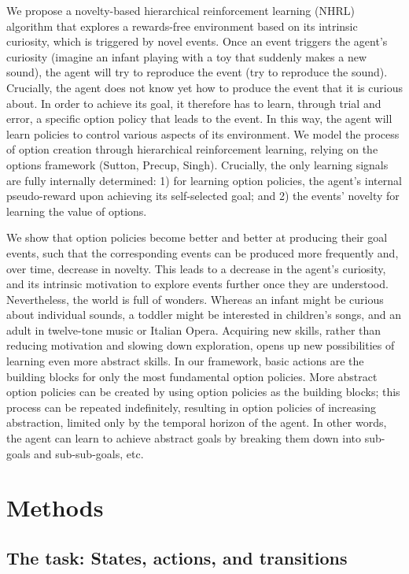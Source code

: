 \documentclass{article}
\begin{document}
We propose a novelty-based hierarchical reinforcement learning (NHRL) algorithm that explores a rewards-free environment based on its intrinsic curiosity, which is triggered by novel events. Once an event triggers the agent's curiosity (imagine an infant playing with a toy that suddenly makes a new sound), the agent will try to reproduce the event (try to reproduce the sound). Crucially, the agent does not know yet how to produce the event that it is curious about. In order to achieve its goal, it therefore has to learn, through trial and error, a specific option policy that leads to the event. In this way, the agent will learn policies to control various aspects of its environment. We model the process of option creation through hierarchical reinforcement learning, relying on the options framework (Sutton, Precup, Singh). Crucially, the only learning signals are fully internally determined: 1) for learning option policies, the agent's internal pseudo-reward upon achieving its self-selected goal; and 2) the events' novelty for learning the value of options.

We show that option policies become better and better at producing their goal events, such that the corresponding events can be produced more frequently and, over time, decrease in novelty. This leads to a decrease in the agent's curiosity, and its intrinsic motivation to explore events further once they are understood. Nevertheless, the world is full of wonders. Whereas an infant might be curious about individual sounds, a toddler might be interested in children's songs, and an adult in twelve-tone music or Italian Opera. Acquiring new skills, rather than reducing motivation and slowing down exploration, opens up new possibilities of learning even more abstract skills. In our framework, basic actions are the building blocks for only the most fundamental option policies. More abstract option policies can be created by using option policies as the building blocks; this process can be repeated indefinitely, resulting in option policies of increasing abstraction, limited only by the temporal horizon of the agent. In other words, the agent can learn to achieve abstract goals by breaking them down into sub-goals and sub-sub-goals, etc.

\section{Methods}
 
\subsection{The task: States, actions, and transitions}
\end{document}
